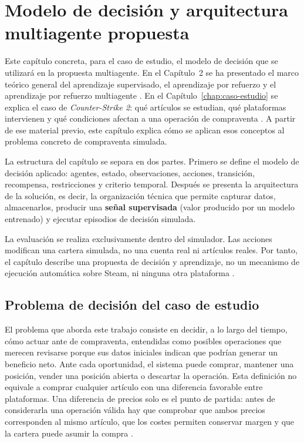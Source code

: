 \chapter{Modelo de decisión y arquitectura multiagente propuesta}

\label{chap:propuesta}

\noindent Este capítulo concreta, para el caso de estudio, el modelo de decisión que se utilizará en la propuesta multiagente. En el Capítulo~2 se ha presentado el marco teórico general del aprendizaje supervisado, el aprendizaje por refuerzo y el aprendizaje por refuerzo multiagente \cite{sutton2018reinforcement,wooldridge2009multiagent,busoniu2008comprehensive}. En el Capítulo~\ref{chap:caso-estudio} se explica el caso de \textit{Counter-Strike 2}: qué artículos se estudian, qué plataformas intervienen y qué condiciones afectan a una operación de compraventa \cite{steamMarketFAQ,buffMarketplace,counterStrike2}. A partir de ese material previo, este capítulo explica cómo se aplican esos conceptos al problema concreto de compraventa simulada.

La estructura del capítulo se separa en dos partes. Primero se define el modelo de decisión aplicado: agentes, estado, observaciones, acciones, transición, recompensa, restricciones y criterio temporal. Después se presenta la arquitectura de la solución, es decir, la organización técnica que permite capturar datos, almacenarlos, producir una \textbf{ {señal supervisada}} (valor producido por un modelo entrenado) y ejecutar episodios de decisión simulada. 

La evaluación se realiza exclusivamente dentro del simulador. Las acciones modifican una cartera simulada, no una cuenta real ni artículos reales. Por tanto, el capítulo describe una propuesta de decisión y aprendizaje, no un mecanismo de ejecución automática sobre Steam,  ni ninguna otra plataforma \cite{steamMarketFAQ,buffMarketplace}.

\section{Problema de decisión del caso de estudio}
\label{sec:definicion-problema-decision}

El problema que aborda este trabajo consiste en decidir, a lo largo del tiempo, cómo actuar ante \textbf{} de compraventa, entendidas como posibles operaciones que merecen revisarse porque sus datos iniciales indican que podrían generar un beneficio neto. Ante cada oportunidad, el sistema puede comprar, mantener una posición, vender una posición abierta o descartar la operación. Esta definición no equivale a comprar cualquier artículo con una diferencia favorable entre plataformas. Una diferencia de precios solo es el punto de partida: antes de considerarla una operación válida hay que comprobar que ambos precios corresponden al mismo artículo, que los costes permiten conservar margen y que la cartera puede asumir la compra \cite{liu2021finrl}.

